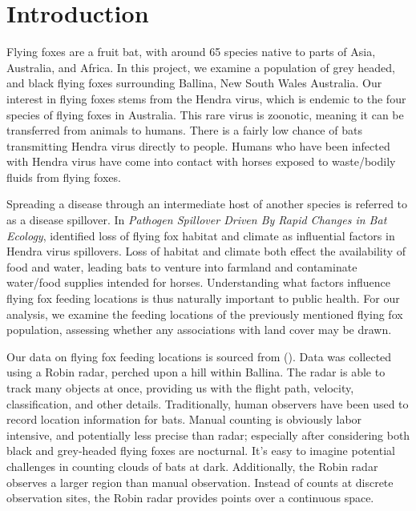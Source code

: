 \documentclass[
  12pt,
  letterpaper,
  DIV=11,
  numbers=noendperiod]{scrartcl}
\renewcommand*\contentsname{Table of contents}
\newcommand\contentsname{Table of contents}
\begin{document}
\vspace{2.in}
\begin{abstract}

\end{abstract}


\newpage


\renewcommand*\contentsname{Table of contents}
{
\hypersetup{linkcolor=}
\setcounter{tocdepth}{3}
\tableofcontents
}

\newpage

\section{Introduction}\label{sec:intro}

Flying foxes are a fruit bat, with around 65 species native to parts of
Asia, Australia, and Africa. In this project, we examine a population of
grey headed, and black flying foxes surrounding Ballina, New South Wales
Australia. Our interest in flying foxes stems from the Hendra virus,
which is endemic to the four species of flying foxes in Australia. This
rare virus is zoonotic, meaning it can be transferred from animals to
humans. There is a fairly low chance of bats transmitting Hendra virus
directly to people. Humans who have been infected with Hendra virus have
come into contact with horses exposed to waste/bodily fluids from flying
foxes.

Spreading a disease through an intermediate host of another species is
referred to as a disease spillover. In \emph{Pathogen Spillover Driven
By Rapid Changes in Bat Ecology}, \cite{andy_art} identified loss of
flying fox habitat and climate as influential factors in Hendra virus
spillovers. Loss of habitat and climate both effect the availability of
food and water, leading bats to venture into farmland and contaminate
water/food supplies intended for horses. Understanding what factors
influence flying fox feeding locations is thus naturally important to
public health. For our analysis, we examine the feeding locations of the
previously mentioned flying fox population, assessing whether any
associations with land cover may be drawn.

Our data on flying fox feeding locations is sourced from (). Data was
collected using a Robin radar, perched upon a hill within Ballina. The
radar is able to track many objects at once, providing us with the
flight path, velocity, classification, and other details. Traditionally,
human observers have been used to record location information for bats.
Manual counting is obviously labor intensive, and potentially less
precise than radar; especially after considering both black and
grey-headed flying foxes are nocturnal. It's easy to imagine potential
challenges in counting clouds of bats at dark. Additionally, the Robin
radar observes a larger region than manual observation. Instead of
counts at discrete observation sites, the Robin radar provides points
over a continuous space.
\end{document}
